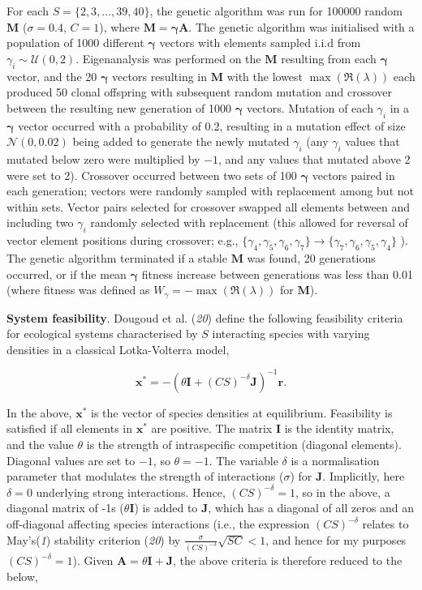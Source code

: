 \documentclass[]{article}
\begin{document}
For each \(S = \{2, 3, ..., 39, 40\}\), the genetic algorithm was run
for 100000 random \(\mathbf{M}\) (\(\sigma = 0.4\), \(C = 1\)), where
\(\mathbf{M = \gamma A}\). The genetic algorithm was initialised with a
population of 1000 different \(\mathbf{\gamma}\) vectors with elements
sampled i.i.d from \(\gamma_{i} \sim \mathcal{U}(0, 2)\). Eigenanalysis
was performed on the \(\mathbf{M}\) resulting from each
\(\mathbf{\gamma}\) vector, and the 20 \(\mathbf{\gamma}\) vectors
resulting in \(\mathbf{M}\) with the lowest
\(\max\left(\Re(\lambda)\right)\) each produced 50 clonal offspring with
subsequent random mutation and crossover between the resulting new
generation of 1000 \(\mathbf{\gamma}\) vectors. Mutation of each
\(\gamma_{i}\) in a \(\mathbf{\gamma}\) vector occurred with a
probability of 0.2, resulting in a mutation effect of size
\(\mathcal{N}(0, 0.02)\) being added to generate the newly mutated
\(\gamma_{i}\) (any \(\gamma_{i}\) values that mutated below zero were
multiplied by \(-1\), and any values that mutated above 2 were set to
2). Crossover occurred between two sets of 100 \(\mathbf{\gamma}\)
vectors paired in each generation; vectors were randomly sampled with
replacement among but not within sets. Vector pairs selected for
crossover swapped all elements between and including two \(\gamma_{i}\)
randomly selected with replacement (this allowed for reversal of vector
element positions during crossover; e.g.,
\(\{\gamma_{4}, \gamma_{5}, \gamma_{6}, \gamma_{7}\} \to \{\gamma_{7}, \gamma_{6}, \gamma_{5}, \gamma_{4}\}\)
). The genetic algorithm terminated if a stable \(\mathbf{M}\) was
found, 20 generations occurred, or if the mean \(\mathbf{\gamma}\)
fitness increase between generations was less than 0.01 (where fitness
was defined as \(W_{\gamma} = -\max\left(\Re(\lambda)\right)\) for
\(\mathbf{M}\)).

\textbf{System feasibility}. Dougoud et al. (\emph{20}) define the
following feasibility criteria for ecological systems characterised by
\(S\) interacting species with varying densities in a classical
Lotka-Volterra model,

\[\mathbf{x^{*}} = -\left(\theta \mathbf{I} + (CS)^{-\delta}\mathbf{J} \right)^{-1}\mathbf{r}.\]

In the above, \(\mathbf{x^{*}}\) is the vector of species densities at
equilibrium. Feasibility is satisfied if all elements in
\(\mathbf{x^{*}}\) are positive. The matrix \(\mathbf{I}\) is the
identity matrix, and the value \(\theta\) is the strength of
intraspecific competition (diagonal elements). Diagonal values are set
to \(-1\), so \(\theta = -1\). The variable \(\delta\) is a
normalisation parameter that modulates the strength of interactions
(\(\sigma\)) for \(\mathbf{J}\). Implicitly, here \(\delta = 0\)
underlying strong interactions. Hence, \((CS)^{-\delta} = 1\), so in the
above, a diagonal matrix of -1s (\(\theta \mathbf{I}\)) is added to
\(\mathbf{J}\), which has a diagonal of all zeros and an off-diagonal
affecting species interactions (i.e., the expression \((CS)^{-\delta}\)
relates to May's(\emph{1}) stability criterion (\emph{20}) by
\(\frac{\sigma}{(CS)^{-\delta}}\sqrt{SC} < 1\), and hence for my
purposes \((CS)^{-\delta} = 1\)). Given
\(\mathbf{A} = \theta\mathbf{I + J}\), the above criteria is therefore
reduced to the below,
\end{document}
